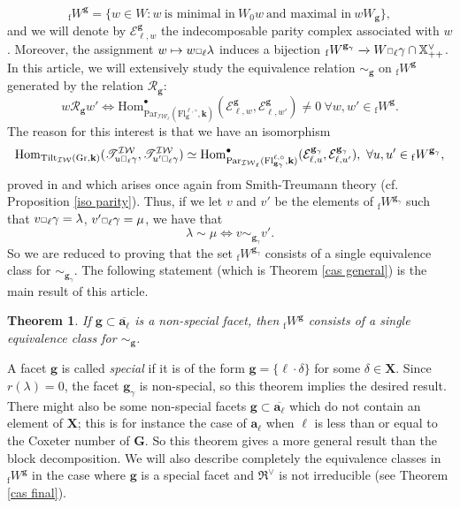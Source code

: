 \documentclass[11pt]{amsart}
\theoremstyle{plain}
\newtheorem{thm}{Theorem}[section]
\theoremstyle{remark}
\newcommand{\car}{\mbox{\relsize{-5}$\Box$}}
\numberwithin{equation}{section}
\begin{document}
	$${_\mathrm{f}W}^\mathbf{g}=\{w\in W:w~\text{is minimal in}~W_0w~\text{and maximal in}~wW_\mathbf{g}\}, $$
	and we will denote by $\mathcal{E}_{\ell,w}^\mathbf{g}$ the indecomposable parity complex associated with $w$. Moreover, the assignment $w\mapsto w\car_\ell\lambda$ induces a bijection ${_\mathrm{f}W}^{\mathbf{g}_\gamma}\xrightarrow{~}W\car_\ell\gamma\cap\mathbb{X}^\vee_{++}$. In this article, we will extensively study the equivalence relation $\sim_\mathbf{g}$ on ${_\mathrm{f}W}^\mathbf{g}$ generated by the relation $\mathscr{R}_\mathbf{g}$: 
	\begin{equation}
	    w\mathscr{R}_{\mathbf{g}}w'\Longleftrightarrow \mathrm{Hom}^\bullet_{\mathrm{Par}_{\mathcal{IW}_\ell}(\mathrm{Fl}^{\ell,\circ}_{\mathbf{g}},\mathbf{k})}(\mathcal{E}^{\mathbf{g}}_{\ell,w},\mathcal{E}^{\mathbf{g}}_{\ell,w'})\neq 0~\forall w,w'\in {_\mathrm{f}W}^{\mathbf{g}}.
	\end{equation}
	The reason for this interest is that we have an isomorphism
	\begin{equation}\label{eqintro}
	    \mathrm{Hom}_{\mathrm{Tilt}_\mathcal{IW}(\mathrm{Gr},\mathbf{k})}(\mathscr{T}^\mathcal{IW}_{u\car_\ell\gamma},\mathscr{T}^\mathcal{IW}_{u'\car_\ell\gamma})\simeq \mathrm{Hom}^\bullet_{\mathrm{Par}_{\mathcal{IW}_\ell}(\mathrm{Fl}^{\ell,\circ}_{\mathbf{g}_\gamma},\mathbf{k})}(\mathcal{E}_{\ell,u}^{\mathbf{g}_\gamma},\mathcal{E}_{\ell,u'}^{\mathbf{g}_\gamma}),~\forall u,u'\in {_\mathrm{f}W}^{\mathbf{g}_\gamma},
	\end{equation}
	proved in \cite{riche2020smithtreumann} and which arises once again from Smith-Treumann theory (cf. Proposition \ref{iso parity}).
	 Thus, if we let $v$ and $v'$ be the elements of ${_\mathrm{f}W}^{\mathbf{g}_\gamma}$ such that $v\car_\ell\gamma=\lambda$, $v'\car_\ell\gamma=\mu$, we have that
	 $$\lambda\sim\mu\Longleftrightarrow v\sim_{\mathbf{g}_\gamma}v'. $$
	 So we are reduced to proving that the set ${_\mathrm{f}W}^{\mathbf{g}_\gamma}$ consists of a single equivalence class for $\sim_{\mathbf{g}_\gamma}$. The following statement (which is Theorem \ref{cas general}) is the main result of this article.
	 \begin{thm}\label{thm 1.3}
	     If $\mathbf{g}\subset\overline{\mathbf{a}_\ell}$ is a non-special facet, then ${_\mathrm{f}W}^{\mathbf{g}}$ consists of a single equivalence class for $\sim_\mathbf{g}$.
	 \end{thm}
	 A facet $\mathbf{g}$ is called \textit{special} if it is of the form $\mathbf{g}=\{\ell\cdot\delta\}$ for some $\delta\in\mathbf{X}$. Since $r(\lambda)=0$, the facet $\mathbf{g}_\gamma$ is non-special, so this theorem implies the desired result. There might also be some non-special facets  $\mathbf{g}\subset\overline{\mathbf{a}_\ell}$ which do not contain an element of $\mathbf{X}$; this is for instance the case of $\mathbf{a}_\ell$ when $\ell$ is less than or equal to the Coxeter number of $\mathbf{G}$. So this theorem gives a more general result than the block decomposition. We will also describe completely the equivalence classes in ${_\mathrm{f}W}^{\mathbf{g}}$ in the case where $\mathbf{g}$ is a special facet and $\mathfrak{R}^\vee$ is not irreducible (see Theorem \ref{cas final}). 
	 
\end{document}
